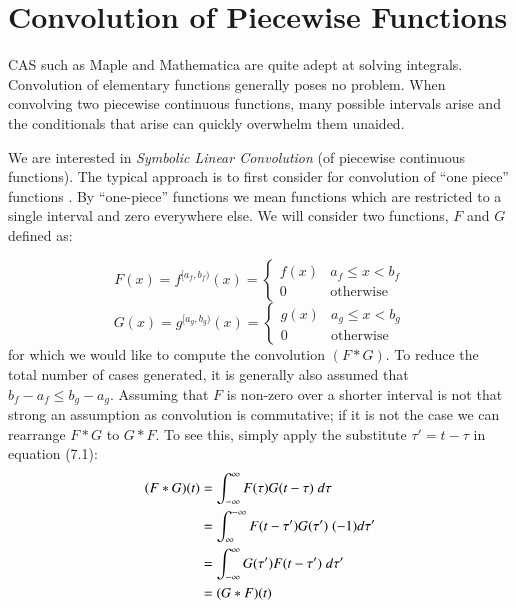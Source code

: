 \section{Convolution of Piecewise Functions}


CAS such as Maple and Mathematica are quite adept at solving integrals.
Convolution of elementary functions generally poses no problem.
When convolving two piecewise continuous functions, many possible intervals arise and the conditionals that arise
can quickly overwhelm them unaided. 


We are interested in \emph{Symbolic Linear Convolution} (of piecewise continuous functions).
The typical approach is to first consider for convolution of ``one piece'' functions 
\cite{evans1994algorithms, west1993symbolic}.
By ``one-piece'' functions we mean functions which are restricted to a single interval and zero everywhere else.
We will consider two functions, $F$ and $G$ defined as:


\begin{equation}
	\label{eqn:fOnePiece}
	F(x)=f^{[a_f,b_f)}(x) = 
		\begin{cases}
			f(x) & a_f \leq x < b_f \\
			0 & \text{otherwise}
		\end{cases}
\end{equation}
\begin{equation}
	\label{eqn:gOnePiece}
	G(x)=g^{[a_g,b_g)}(x) = 
		\begin{cases}
			g(x) & a_g \leq x < b_g \\
			0 & \text{otherwise}
		\end{cases}
\end{equation}
for which we would like to compute the convolution $(F*G)$.
To reduce the total number of cases generated, it is generally also assumed that $b_f - a_f \leq b_g - a_g$.
Assuming that $F$ is non-zero over a shorter interval is not that strong an assumption as convolution is commutative;
if it is not the case we can rearrange $F*G$ to $G*F$.
To see this, simply apply the substitute $\tau' = t-\tau$ in equation (7.1):
\begin{align}
	\label{eqn:ConvCommutative}
	(F*G)(t) 
		&= \int_{-\infty}^\infty F(\tau) G(t-\tau) \;d \tau 
		\notag\\&= \int_{\infty}^{-\infty} F(t-\tau')G(\tau')\; (-1) d\tau' 
		\notag\\&= \int_{-\infty}^\infty G(\tau') F(t-\tau') \; d\tau'
		\notag\\&= (G*F)(t)
\end{align}



